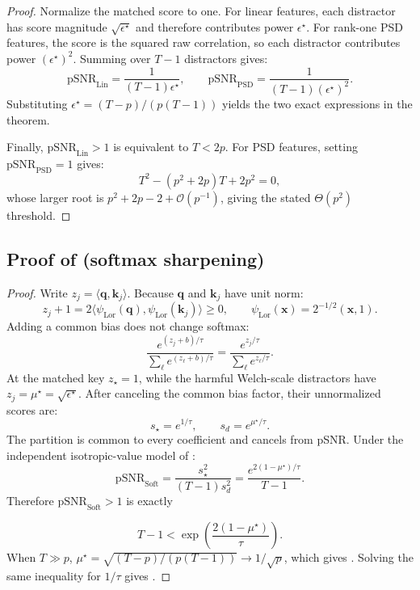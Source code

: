 \documentclass{article}
\newcommand{\1}{\bm{1}}
\newcommand{\lrangle}[1]{\langle#1\rangle}
\def\eps{{\epsilon}}
\def\vk{{\bm{k}}}
\def\vq{{\bm{q}}}
\def\vx{{\bm{x}}}
\def\gO{{\mathcal{O}}}
\theoremstyle{definition}
\begin{document}
\begin{proof}
  Normalize the matched score to one. For linear features, each distractor has score magnitude
  $\sqrt{\eps^\star}$ and therefore contributes power $\eps^\star$. For rank-one PSD features, the
  score is the squared raw correlation, so each distractor contributes power
  $(\eps^\star)^2$. Summing over $T-1$ distractors gives:
  \[
    \mathrm{pSNR}_{\mathrm{Lin}}
      =\frac{1}{(T-1)\eps^\star},
    \qquad
    \mathrm{pSNR}_{\mathrm{PSD}}
      =\frac{1}{(T-1)(\eps^\star)^2}.
  \]
  Substituting $\eps^\star=(T-p)/(p(T-1))$ yields the two exact expressions in the theorem.

  Finally, $\mathrm{pSNR}_{\mathrm{Lin}}>1$ is equivalent to $T<2p$. For PSD features, setting
  $\mathrm{pSNR}_{\mathrm{PSD}}=1$ gives:
  \[
    T^2-(p^2+2p)T+2p^2=0,
  \]
  whose larger root is $p^2+2p-2+\gO(p^{-1})$, giving the stated $\Theta(p^2)$ threshold.
\end{proof}

\subsection{\texorpdfstring{Proof of  (softmax sharpening)}{Proof of softmax sharpening}}
\label{app:softmaxsnr}

\begin{proof}
  Write $z_j=\lrangle{\vq,\vk_j}$. Because $\vq$ and $\vk_j$ have unit norm:
  \[
    z_j+1
      =2\lrangle{\psi_{\mathrm{Lor}}(\vq),\psi_{\mathrm{Lor}}(\vk_j)}
      \ge0,
    \qquad
    \psi_{\mathrm{Lor}}(\vx)=2^{-1/2}(\vx,1).
  \]
  Adding a common bias does not change softmax:
  \[
    \frac{e^{(z_j+b)/\tau}}{\sum_\ell e^{(z_\ell+b)/\tau}}
      =\frac{e^{z_j/\tau}}{\sum_\ell e^{z_\ell/\tau}}.
  \]
  At the matched key $z_\star=1$, while the harmful Welch-scale distractors have
  $z_j=\mu^\star=\sqrt{\eps^\star}$. After canceling the common bias factor, their unnormalized
  scores are:
  \[
    s_\star=e^{1/\tau},
    \qquad
    s_d=e^{\mu^\star/\tau}.
  \]
  The partition is common to every coefficient and cancels from pSNR. Under the independent
  isotropic-value model of :
  \[
    \mathrm{pSNR}_{\mathrm{Soft}}
      =\frac{s_\star^2}{(T-1)s_d^2}
      =\frac{e^{2(1-\mu^\star)/\tau}}{T-1}.
  \]
  Therefore $\mathrm{pSNR}_{\mathrm{Soft}}>1$ is exactly
  
  \begin{equation}
    T-1
    <\exp\!\left(\frac{2(1-\mu^\star)}{\tau}\right).
    \label{eq:softmax-psnr-capacity}
  \end{equation}
  When $T\gg p$, $\mu^\star=\sqrt{(T-p)/(p(T-1))}\to1/\sqrt p$, which gives
  . Solving the same inequality for $1/\tau$ gives
  .
\end{proof}
\end{document}
